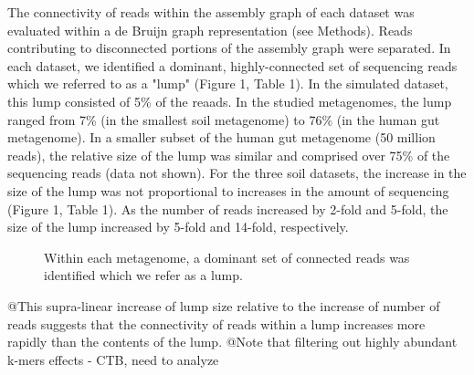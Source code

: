\documentclass[11pt]{article} %
\begin{document}
The connectivity of reads within the assembly graph of each dataset was evaluated within a de Bruijn graph representation (see Methods).  Reads contributing to disconnected portions of the assembly graph were separated.  In each dataset, we identified a dominant, highly-connected set of sequencing reads which we referred to as a "lump" (Figure 1, Table 1).  In the simulated dataset, this lump consisted of 5\% of the reaads.  In the studied metagenomes, the lump ranged from 7\% (in the smallest soil metagenome) to 76\% (in the human gut metagenome).  In a smaller subset of the human gut metagenome (50 million reads), the relative size of the lump was similar and comprised over 75\% of the sequencing reads (data not shown).  For the three soil datasets, the increase in the size of the lump was not proportional to increases in the amount of sequencing (Figure 1, Table 1).  As the number of reads increased by 2-fold and 5-fold, the size of the lump increased by 5-fold and 14-fold, respectively.  

\begin{figure}
\caption{Within each metagenome, a dominant set of connected reads was identified which we refer as a lump.}
\end{figure}



@This supra-linear increase of lump size relative to the increase of number of reads suggests that the connectivity of reads within a lump increases more rapidly than the contents of the lump.  
@Note that filtering out highly abundant k-mers effects - CTB, need to analyze
\end{document}
